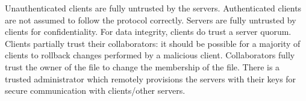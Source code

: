 Unauthenticated clients are fully untrusted by the servers.
Authenticated clients are not assumed to follow the protocol
correctly. Servers are fully untrusted by clients for confidentiality.
For data integrity, clients do trust a server quorum. Clients
partially trust their collaborators: it should be possible for
a majority of clients to rollback changes performed by a malicious client.
Collaborators fully trust the owner of the file to change the
membership of the file. There is a trusted administrator which
remotely provisions the servers with their keys for secure
communication with clients/other servers.

